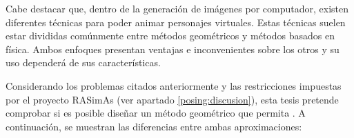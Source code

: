  
Cabe destacar que, dentro de la generación de imágenes por computador, existen diferentes técnicas para poder animar personajes virtuales.
Estas técnicas suelen estar divididas comúnmente entre métodos geométricos y métodos basados en física. Ambos enfoques presentan ventajas e inconvenientes sobre los otros y su uso dependerá de sus características. 

Considerando los problemas citados anteriormente y las restricciones impuestas por el proyecto \ac{RASimAs} (ver apartado \ref{posing:discusion}), esta tesis pretende comprobar si es posible diseñar un método geométrico que permita . A continuación, se muestran las diferencias entre ambas aproximaciones:

